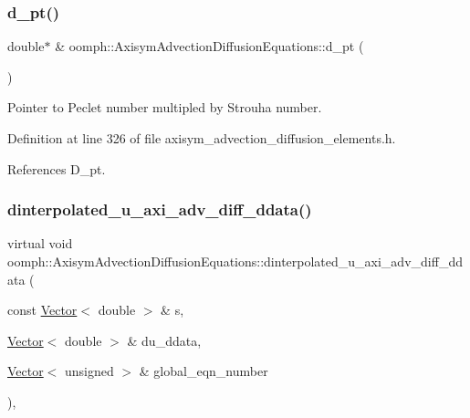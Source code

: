 \subsubsection{\texorpdfstring{d\+\_\+pt()}{d\_pt()}}
{\footnotesize\ttfamily double$\ast$ \& oomph\+::\+Axisym\+Advection\+Diffusion\+Equations\+::d\+\_\+pt (\begin{DoxyParamCaption}{ }\end{DoxyParamCaption})\hspace{0.3cm}{\ttfamily [inline]}}



Pointer to Peclet number multipled by Strouha number. 



Definition at line 326 of file axisym\+\_\+advection\+\_\+diffusion\+\_\+elements.\+h.



References D\+\_\+pt.

\mbox{\label{classoomph_1_1AxisymAdvectionDiffusionEquations_a83fd782e690a7ca9f6ac4995c964e4b5}} 
\subsubsection{\texorpdfstring{dinterpolated\+\_\+u\+\_\+axi\+\_\+adv\+\_\+diff\+\_\+ddata()}{dinterpolated\_u\_axi\_adv\_diff\_ddata()}}
{\footnotesize\ttfamily virtual void oomph\+::\+Axisym\+Advection\+Diffusion\+Equations\+::dinterpolated\+\_\+u\+\_\+axi\+\_\+adv\+\_\+diff\+\_\+ddata (\begin{DoxyParamCaption}\item[{const \hyperlink{classoomph_1_1Vector}{Vector}$<$ double $>$ \&}]{s,  }\item[{\hyperlink{classoomph_1_1Vector}{Vector}$<$ double $>$ \&}]{du\+\_\+ddata,  }\item[{\hyperlink{classoomph_1_1Vector}{Vector}$<$ unsigned $>$ \&}]{global\+\_\+eqn\+\_\+number }\end{DoxyParamCaption})\hspace{0.3cm}{\ttfamily [inline]}, {\ttfamily [virtual]}}



